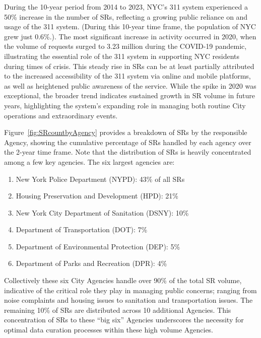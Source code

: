 \documentclass[linenumber]{jdsart}
\begin{document}
During the 10-year period from 2014 to 2023,  NYC's 311 system
experienced a 50\% increase in the number of SRs, 
reflecting a growing public reliance on and usage of 
the 311 system. (During this 10-year time frame, the 
population of NYC grew just 0.6\%.). The most significant increase
in activity occurred in 2020, when the volume of requests 
surged to 3.23 million during the COVID-19 pandemic, 
illustrating the essential role of the 311 system in supporting 
NYC residents during times of crisis. This steady 
rise in SRs can be at least partially attributed to the increased 
accessibility of the 311 system via online and mobile 
platforms, as well as heightened public awareness of the service. 
While the spike in 2020 was exceptional, the broader trend 
indicates sustained growth in SR volume in future years,  
highlighting the system's expanding role in managing 
both routine City operations and extraordinary events.



Figure~\ref{fig:SRcountbyAgency} provides a breakdown of SRs by
the responsible Agency, showing the cumulative 
percentage of SRs handled by each
agency over the 2-year time frame. Note that the
distribution of SRs is heavily concentrated among a few key 
agencies. The six largest agencies are:

\begin{enumerate}[left=1.5em]
    \item New York Police Department (NYPD): 43\% of all SRs
    \item Housing Preservation and Development (HPD): 21\%
    \item New York City Department of Sanitation (DSNY): 10\%
    \item Department of Transportation (DOT): 7\%
    \item Department of Environmental Protection (DEP): 5\%
    \item Department of Parks and Recreation (DPR): 4\%
\end{enumerate}


Collectively these six City Agencies handle over 90\% of the total SR 
volume, indicative of the critical role they play in managing
public concerns; ranging from noise complaints and housing issues to
sanitation and transportation issues. The remaining
10\% of SRs are distributed across 10 additional Agencies. 
This concentration of SRs to these ``big six'' Agencies 
underscores the necessity for optimal data curation processes 
within these  high volume Agencies.
\end{document}
